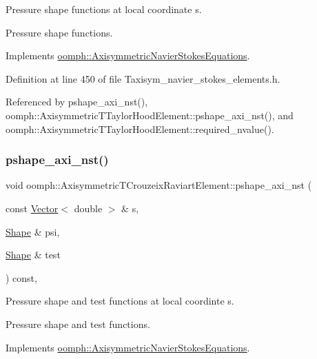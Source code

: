 Pressure shape functions at local coordinate s. 

Pressure shape functions. 

Implements \hyperlink{classoomph_1_1AxisymmetricNavierStokesEquations_a6309780fd1964c4df0cca0818ccff158}{oomph\+::\+Axisymmetric\+Navier\+Stokes\+Equations}.



Definition at line 450 of file Taxisym\+\_\+navier\+\_\+stokes\+\_\+elements.\+h.



Referenced by pshape\+\_\+axi\+\_\+nst(), oomph\+::\+Axisymmetric\+T\+Taylor\+Hood\+Element\+::pshape\+\_\+axi\+\_\+nst(), and oomph\+::\+Axisymmetric\+T\+Taylor\+Hood\+Element\+::required\+\_\+nvalue().

\mbox{\label{classoomph_1_1AxisymmetricTCrouzeixRaviartElement_adb45e981a3fbe7894f14264bd13e1b7f}} 
\subsubsection{\texorpdfstring{pshape\+\_\+axi\+\_\+nst()}{pshape\_axi\_nst()}\hspace{0.1cm}{\footnotesize\ttfamily [2/2]}}
{\footnotesize\ttfamily void oomph\+::\+Axisymmetric\+T\+Crouzeix\+Raviart\+Element\+::pshape\+\_\+axi\+\_\+nst (\begin{DoxyParamCaption}\item[{const \hyperlink{classoomph_1_1Vector}{Vector}$<$ double $>$ \&}]{s,  }\item[{\hyperlink{classoomph_1_1Shape}{Shape} \&}]{psi,  }\item[{\hyperlink{classoomph_1_1Shape}{Shape} \&}]{test }\end{DoxyParamCaption}) const\hspace{0.3cm}{\ttfamily [inline]}, {\ttfamily [virtual]}}



Pressure shape and test functions at local coordinte s. 

Pressure shape and test functions. 

Implements \hyperlink{classoomph_1_1AxisymmetricNavierStokesEquations_a19a4135581356bf368a7ecae2b315f85}{oomph\+::\+Axisymmetric\+Navier\+Stokes\+Equations}.



